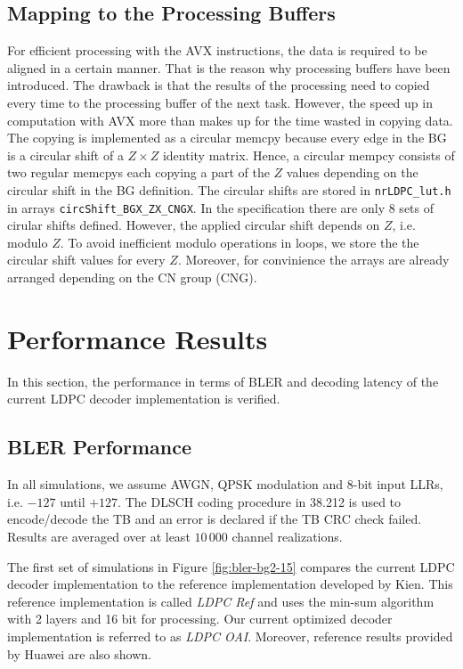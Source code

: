\documentclass{article}
\begin{document}
\subsection{Mapping to the Processing Buffers}
\label{sec:mapp-cn-proc}

For efficient processing with the AVX instructions, the data is required to be aligned in a certain manner. That is the reason why processing buffers have been introduced. The drawback is that the results of the processing need to copied every time to the processing buffer of the next task. However, the speed up in computation with AVX more than makes up for the time wasted in copying data. The copying is implemented as a circular memcpy because every edge in the BG is a circular shift of a $Z\times Z$ identity matrix. Hence, a circular mempcy consists of two regular memcpys each copying a part of the $Z$ values depending on the circular shift in the BG definition. The circular shifts are stored in \texttt{nrLDPC\_lut.h} in arrays \texttt{circShift\_BGX\_ZX\_CNGX}. In the specification there are only 8 sets of cirular shifts defined. However, the applied circular shift depends on $Z$, i.e. modulo $Z$. To avoid inefficient modulo operations in loops, we store the the circular shift values for every $Z$. Moreover, for convinience the arrays are already arranged depending on the CN group (CNG).

\newpage
\section{Performance Results}
\label{sec:performance-results}

In this section, the performance in terms of BLER and decoding latency of the current LDPC decoder implementation is verified.

\subsection{BLER Performance}
\label{sec:bler-performance}

In all simulations, we assume AWGN, QPSK modulation and 8-bit input LLRs, i.e. $-127$ until $+127$. The DLSCH coding procedure in 38.212 is used to encode/decode the TB and an error is declared if the TB CRC check failed. Results are averaged over at least $10\,000$ channel realizations. 

The first set of simulations in Figure \ref{fig:bler-bg2-15} compares the current LDPC decoder implementation to the reference implementation developed by Kien. This reference implementation is called \textit{LDPC Ref} and uses the min-sum algorithm with 2 layers and 16 bit for processing. Our current optimized decoder implementation is referred to as \textit{LDPC OAI}. Moreover, reference results provided by Huawei are also shown.
\end{document}
